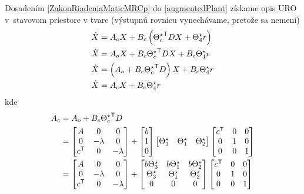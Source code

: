 \documentclass[a4paper, 10pt, ]{article}
\begin{document}
Dosadením \eqref{ZakonRiadeniaMaticMRCp} do \eqref{augmentedPlant} získame opis URO v~stavovom priestore v tvare (výstupnú rovnicu vynechávame, pretože sa nemení)
\begin{subequations} \label{UROaugmentedPlant}
	\begin{align}
		\dot X &= A_o X + B_c \left( {\Theta_c^\star}^{\mathsf{T}} D X + \Theta_4^\star r \right) \\
		\dot X &= A_o X + B_c {\Theta_c^\star}^{\mathsf{T}} D X + B_c \Theta_4^\star r \\
		\dot X &= \left( A_o + B_c {\Theta_c^\star}^{\mathsf{T}} D \right) X + B_c \Theta_4^\star r \\
		\dot X &= A_c X + B_c \Theta_4^\star r
	\end{align}
\end{subequations}
kde
\begin{equation}
	\begin{split}
		A_c &= A_o + B_c {\Theta_c^\star}^\naT D \\
		&=
		\begin{bmatrix} A & 0 & 0 \\ 0 & -\lambda & 0 \\ c^\naT & 0 & -\lambda \end{bmatrix}
	 	+
	 	\begin{bmatrix} b \\ 1\\ 0 \end{bmatrix}
	 	\begin{bmatrix} \Theta_3^\star & \Theta_1^\star & \Theta_2^\star \end{bmatrix}
		\begin{bmatrix} c^\naT & 0 & 0 \\ 0 & 1 & 0 \\ 0 & 0 & 1 \end{bmatrix}
		\\
		&=
		\begin{bmatrix} A & 0 & 0 \\ 0 & -\lambda & 0 \\ c^\naT & 0 & -\lambda \end{bmatrix}
	 	+
	 	\begin{bmatrix} b \Theta_3^\star & b \Theta_1^\star & b \Theta_2^\star \\ \Theta_3^\star & \Theta_1^\star & \Theta_2^\star \\ 0 & 0 & 0 \end{bmatrix}
		\begin{bmatrix} c^\naT  & 0 & 0 \\ 0 & 1 & 0 \\ 0 & 0 & 1 \end{bmatrix}

\end{split}
\end{equation}
\end{document}
